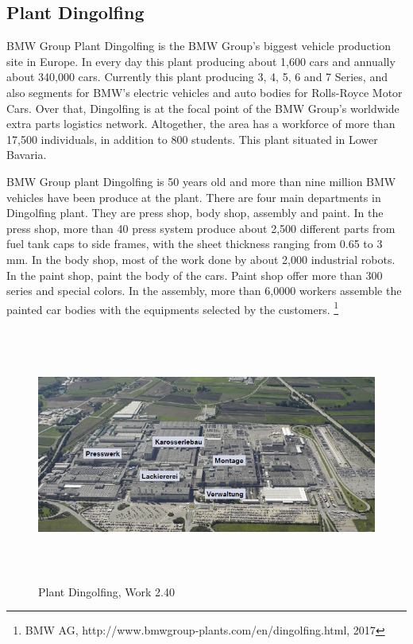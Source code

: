 \subsection{Plant Dingolfing}
BMW Group Plant Dingolfing is the BMW Group's biggest vehicle production site in Europe. In every day this plant producing about 1,600 cars and annually about 340,000 cars. Currently this plant producing 3, 4, 5, 6 and 7 Series, and also segments for BMW's electric vehicles and auto bodies for Rolls-Royce Motor Cars. Over that, Dingolfing is at the focal point of the BMW Group's worldwide extra parts logistics network. Altogether, the area has a workforce of more than 17,500 individuals, in addition to 800 students. This plant situated in Lower Bavaria.\newline 

BMW Group plant Dingolfing is 50 years old and more than nine million BMW vehicles have been produce at the plant. There are four main departments in Dingolfing plant. They are press shop, body shop, assembly and paint. In the press shop, more than 40 press system produce about 2,500 different parts from fuel tank caps to side frames, with the sheet thickness ranging from 0.65 to 3 mm. In the body shop, most of the work done by about 2,000 industrial robots. In the paint shop, paint the body of the cars. Paint shop offer more than 300 series and special colors. In the assembly, more than 6,0000 workers assemble the painted car bodies with the equipments selected by the customers. \footnote{BMW AG, http://www.bmwgroup-plants.com/en/dingolfing.html, 2017}
\begin{figure}[!ht] 
	\centering
		\includegraphics[width=414pt, height=238pt, width=1.0\textwidth]{images/BMW2.PNG}
	\caption[Plant Dingolfing, Work 2.40]{Plant Dingolfing, Work 2.40\footnotemark}
	\label{fig:BMW2}
   \end{figure}

